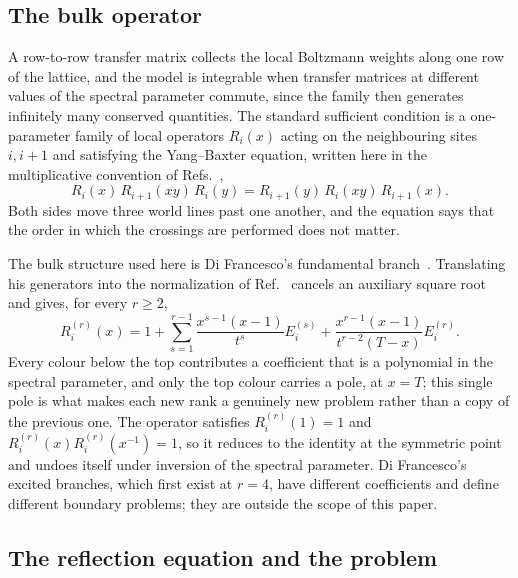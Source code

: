 \documentclass[
  aps,pre,
  reprint,
  superscriptaddress,
  amsmath,amssymb,
  floatfix
]{revtex4-2}
\theoremstyle{plain}
\theoremstyle{definition}
\theoremstyle{remark}
\begin{document}
\subsection{The bulk operator}

A row-to-row transfer matrix collects the local Boltzmann weights along one row
of the lattice, and the model is integrable when transfer matrices at different
values of the spectral parameter commute, since the family then generates
infinitely many conserved quantities. The standard sufficient condition is a
one-parameter family of local operators $R_i(x)$ acting on the neighbouring
sites $i,i+1$ and satisfying the Yang--Baxter equation, written here in the
multiplicative convention of Refs.~\cite{di1998new,shigechi2025fuss},
\begin{equation}
  R_i(x)\,R_{i+1}(xy)\,R_i(y)=R_{i+1}(y)\,R_i(xy)\,R_{i+1}(x).
  \label{eq:ybe}
\end{equation}
Both sides move three world lines past one another, and the equation says that
the order in which the crossings are performed does not matter.

The bulk structure used here is Di Francesco's fundamental
branch~\cite{di1998new}. Translating his generators into the normalization of
Ref.~\cite{shigechi2025fuss} cancels an auxiliary square root and gives, for
every $r\ge2$,
\begin{equation}
  R_i^{(r)}(x)=1+\sum_{s=1}^{r-1}
  \frac{x^{s-1}(x-1)}{t^s}E_i^{(s)}
  +\frac{x^{r-1}(x-1)}{t^{r-2}(T-x)}E_i^{(r)} .
  \label{eq:rmatrix}
\end{equation}
Every colour below the top contributes a coefficient that is a polynomial in
the spectral parameter, and only the top colour carries a pole, at $x=T$; this
single pole is what makes each new rank a genuinely new problem rather than a
copy of the previous one. The operator satisfies $R_i^{(r)}(1)=1$ and
$R_i^{(r)}(x)R_i^{(r)}(x^{-1})=1$, so it reduces to the identity at the
symmetric point and undoes itself under inversion of the spectral parameter.
Di Francesco's excited branches, which first exist at $r=4$, have different
coefficients and define different boundary problems; they are outside the scope
of this paper.

\subsection{The reflection equation and the problem}
\end{document}
